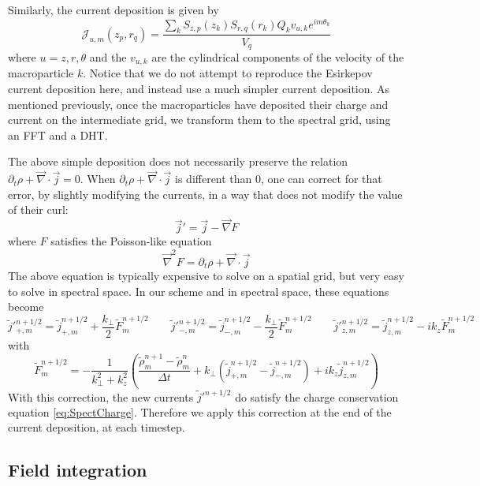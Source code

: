 \documentclass[a4paper]{article}   	%
\begin{document}
Similarly, the current deposition is given by
\[ \mathcal{J}_{u,m}(z_p,r_q) = \frac{\sum_k S_{z,p}(z_k) S_{r,q}(r_k)
Q_k v_{u,k} e^{im\theta_k}}{V_{q}} \]
where $u = z,r,\theta$ and the $v_{u,k}$ are the cylindrical components of the
velocity of the macroparticle $k$. Notice that we do not attempt to
reproduce the Esirkepov current deposition here, and instead use a
much simpler current deposition. As mentioned previously, once the
macroparticles have deposited their charge and current on the
intermediate grid, we transform them to the spectral grid, using an
FFT and a DHT.

The above simple deposition does not necessarily
preserve the relation $\partial_t\rho + \vec{\nabla}\cdot\vec{j} =
0$. When $\partial_t\rho + \vec{\nabla}\cdot\vec{j}$ is different than 0,
one can correct for that error, by slightly modifying the currents, in
a way that does not modify the value of their curl:
\[ \vec{j}' = \vec{j} - \vec{\nabla} F \]
where $F$ satisfies the Poisson-like equation
\[ \vec{\nabla}^2 F = \partial_t\rho + \vec{\nabla}\cdot\vec{j} \]
The above equation is typically expensive to solve on a spatial grid, but
very easy to solve in spectral space. In our scheme and in spectral
space, these equations become
\[ \tilde{j}'^{n+1/2}_{+,m} = \tilde{j}^{n+1/2}_{+,m} +
\frac{k_\perp}{2} \tilde{F}^{n+1/2}_m
\qquad
\tilde{j}'^{n+1/2}_{-,m} = \tilde{j}^{n+1/2}_{-,m} - \frac{k_\perp}{2} \tilde{F}^{n+1/2}_m
\qquad \tilde{j}'^{n+1/2}_{z,m} = \tilde{j}^{n+1/2}_{z,m} - ik_z
\tilde{F}^{n+1/2}_m\]
with
\[ \tilde{F}^{n+1/2}_m = - \frac{1}{k_\perp^2 + k_z^2}\left(
  \frac{\tilde{\rho}^{n+1}_m -\tilde{\rho}^{n}_m}{\Delta t} + k_\perp
  (\tilde{j}^{n+1/2}_{+,m} -\tilde{j}^{n+1/2}_{-,m}) + ik_z\tilde{j}^{n+1/2}_{z,m}  \right) \]
With this correction, the new currents $\tilde{j}'^{n+1/2}$ do satisfy
the charge conservation equation \cref{eq:SpectCharge}. Therefore we apply this
correction at the end of the current deposition, at each timestep.

\subsection{Field integration}
\label{sec:FieldIntegration}
\end{document}
